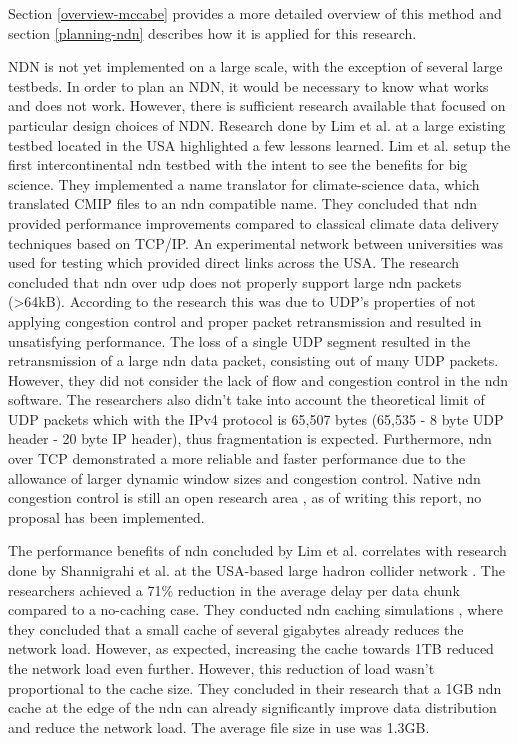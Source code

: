 
Section \ref{overview-mccabe} provides a more detailed overview of this method and section \ref{planning-ndn} describes how it is applied for this research.

NDN is not yet implemented on a large scale, with the exception of several large testbeds. In order to plan an NDN, it would be necessary to know what works and does not work. However, there is sufficient research available that focused on particular design choices of NDN. Research done by Lim et al. \cite{lim2018ndn} at a large existing testbed located in the USA \cite{ndn-testbed-status} highlighted a few lessons learned. Lim et al. setup the first intercontinental \gls{ndn} testbed with the intent to see the benefits for big science. They implemented a name translator for climate-science data, which translated CMIP files to an \gls{ndn} compatible name. They concluded that \gls{ndn} provided performance improvements compared to classical climate data delivery techniques based on TCP/IP. An experimental network between universities was used for testing which provided direct links across the USA. The research concluded that \gls{ndn} over \gls{udp} does not properly support large \gls{ndn} packets (\textgreater 64kB). According to the research this was due to UDP's properties of not applying congestion control and proper packet retransmission and resulted in unsatisfying performance. The loss of a single UDP segment resulted in the retransmission of a large \gls{ndn} data packet, consisting out of many UDP packets. However, they did not consider the lack of flow and congestion control in the \gls{ndn} software. The researchers also didn't take into account the theoretical limit of UDP packets which with the IPv4 protocol is 65,507 bytes (65,535 - 8 byte UDP header - 20 byte IP header), thus fragmentation is expected. Furthermore, \gls{ndn} over TCP demonstrated a more reliable and faster performance due to the allowance of larger dynamic window sizes and congestion control. Native \gls{ndn} congestion control is still an open research area \cite{ren2016congestion}, as of writing this report, no proposal has been implemented.

The performance benefits of \gls{ndn} concluded by Lim et al. correlates with research done by Shannigrahi et al. at the USA-based large hadron collider network \cite{shannigrahi2015named}. The researchers achieved a 71\% reduction in the average delay per data chunk compared to a no-caching case. They conducted \gls{ndn} caching simulations \cite{shannigrahi2017request}, where they concluded that a small cache of several gigabytes already reduces the network load. However, as expected, increasing the cache towards 1TB reduced the network load even further. However, this reduction of load wasn't proportional to the cache size. They concluded in their research that a 1GB \gls{ndn} cache at the edge of the \gls{ndn} can already significantly improve data distribution and reduce the network load. The average file size in use was 1.3GB.

